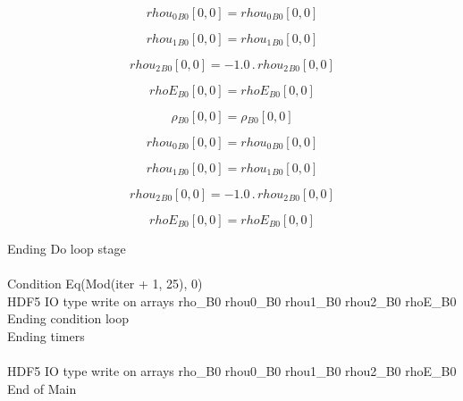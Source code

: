 \documentclass{article}
\begin{document}
\begin{dmath}{rhou_{0}{_{B0}}}[{0,0}] = {rhou_{0}{_{B0}}}[{0,0}]\end{dmath}

\begin{dmath}{rhou_{1}{_{B0}}}[{0,0}] = {rhou_{1}{_{B0}}}[{0,0}]\end{dmath}

\begin{dmath}{rhou_{2}{_{B0}}}[{0,0}] = - 1.0 \,.\, {rhou_{2}{_{B0}}}[{0,0}]\end{dmath}

\begin{dmath}{rhoE{_{B0}}}[{0,0}] = {rhoE{_{B0}}}[{0,0}]\end{dmath}

\begin{dmath}{\rho{_{B0}}}[{0,0}] = {\rho{_{B0}}}[{0,0}]\end{dmath}

\begin{dmath}{rhou_{0}{_{B0}}}[{0,0}] = {rhou_{0}{_{B0}}}[{0,0}]\end{dmath}

\begin{dmath}{rhou_{1}{_{B0}}}[{0,0}] = {rhou_{1}{_{B0}}}[{0,0}]\end{dmath}

\begin{dmath}{rhou_{2}{_{B0}}}[{0,0}] = - 1.0 \,.\, {rhou_{2}{_{B0}}}[{0,0}]\end{dmath}

\begin{dmath}{rhoE{_{B0}}}[{0,0}] = {rhoE{_{B0}}}[{0,0}]\end{dmath}

\noindent Ending Do loop stage\\
\\\noindent Condition Eq(Mod(iter + 1, 25), 0)\\\noindent HDF5 IO type write on arrays rho_B0 rhou0_B0 rhou1_B0 rhou2_B0 rhoE_B0\\\noindent Ending condition loop %
\\\noindent Ending timers\\
\\\noindent HDF5 IO type write on arrays rho_B0 rhou0_B0 rhou1_B0 rhou2_B0 rhoE_B0\\\noindent End of Main\\
\end{document}
